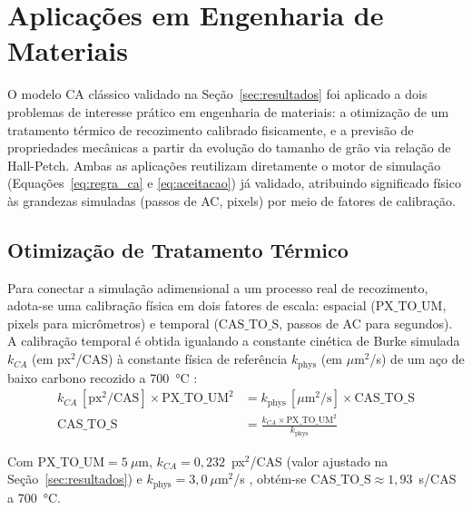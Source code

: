 \documentclass[12pt,a4paper]{article}
\begin{document}
\newpage

\section{Aplicações em Engenharia de Materiais}
\label{sec:aplicacoes}

O modelo CA clássico validado na Seção~\ref{sec:resultados} foi aplicado a dois
problemas de interesse prático em engenharia de materiais: a otimização de um tratamento térmico de
recozimento calibrado fisicamente, e a previsão de propriedades mecânicas a partir
da evolução do tamanho de grão via relação de Hall-Petch. Ambas as aplicações
reutilizam diretamente o motor de simulação (Equações~\ref{eq:regra_ca} e
\ref{eq:aceitacao}) já validado, atribuindo significado físico às grandezas
simuladas (passos de AC, pixels) por meio de fatores de calibração.

\subsection{Otimização de Tratamento Térmico}

Para conectar a simulação adimensional a um processo real de recozimento, adota-se
uma calibração física em dois fatores de escala: espacial
($\text{PX\_TO\_UM}$, pixels para micrômetros) e temporal ($\text{CAS\_TO\_S}$,
passos de AC para segundos). A calibração temporal é obtida igualando a constante
cinética de Burke simulada $k_{CA}$ (em px$^2$/CAS) à constante física de
referência $k_{\text{phys}}$ (em $\mu\text{m}^2$/s) de um aço de baixo carbono
recozido a 700~°C \cite{humphreys2004}:
\begin{equation}
    \begin{split}
    k_{CA}\,[\text{px}^2/\text{CAS}] \times \text{PX\_TO\_UM}^2 &= k_{\text{phys}}\,[\mu\text{m}^2/\text{s}] \times \text{CAS\_TO\_S} \\
    \text{CAS\_TO\_S} &= \frac{k_{CA} \times \text{PX\_TO\_UM}^2}{k_{\text{phys}}}
    \end{split}
    \label{eq:calibracao}
\end{equation}


Com $\text{PX\_TO\_UM} = 5~\mu\text{m}$, $k_{CA} = 0{,}232$~px$^2$/CAS (valor
ajustado na Seção~\ref{sec:resultados}) e $k_{\text{phys}} = 3{,}0~\mu\text{m}^2$/s
\cite{humphreys2004}, obtém-se $\text{CAS\_TO\_S} \approx 1{,}93$~s/CAS a 700~°C.
\end{document}
